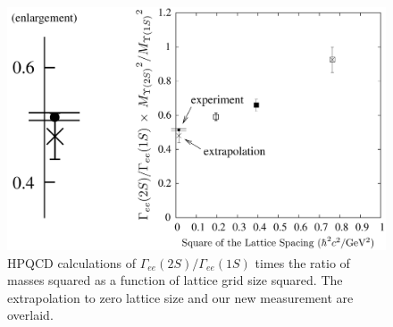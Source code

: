 \documentclass{cornell}
\begin{document}
\begin{figure}[p]
  \begin{center}
    \includegraphics[width=\linewidth]{newnewplots/latticespacingagainagain}
  \end{center}
  \caption[Comparison of our $\Gamma_{ee}(2S)/\Gamma_{ee}(1S)$ with
  the HPQCD calculation]{\label{latticespacingagain} HPQCD
  calculations of $\Gamma_{ee}(2S)/\Gamma_{ee}(1S)$ times the ratio of
  masses squared as a function of lattice grid size squared.  The
  extrapolation to zero lattice size and our new measurement are
  overlaid.}
\end{figure}
\end{document}
